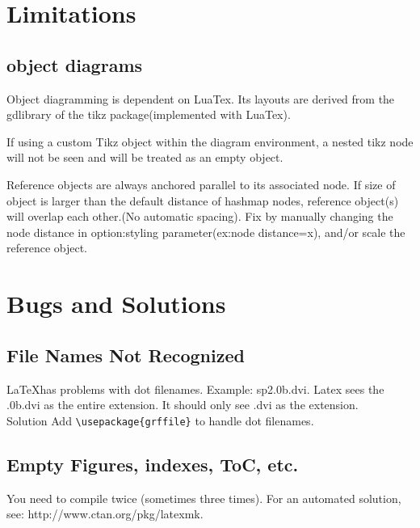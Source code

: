 \documentclass[a4paper]{article}
\begin{document}
\section{Limitations}
\subsection{object diagrams}

Object diagramming is dependent on LuaTex. Its layouts are derived from the gdlibrary of the tikz package(implemented with LuaTex).\\ \newline

If using a custom Tikz object within the diagram environment, a nested tikz node will not be seen and will be treated as an empty object.\\ \newline

Reference objects are always anchored parallel to its associated node. If size of object is larger than the default distance of hashmap nodes, reference object(s) will overlap each other.(No automatic spacing). Fix by manually changing the node distance in option:styling parameter(ex:node distance=x), and/or scale the reference object. \\ \newline

\vspace{3mm}

\section{Bugs and Solutions}
\subsection{File Names Not Recognized}
\LaTeX has problems with dot filenames.
Example:  sp2.0b.dvi. Latex sees the .0b.dvi as the entire extension. It should only see .dvi as the extension.\\
Solution
Add \verb!\usepackage{grffile}! to handle dot filenames.
\subsection{Empty Figures, indexes, ToC, etc.}
You need to compile twice (sometimes three times). For an automated solution, see:  http://www.ctan.org/pkg/latexmk.
\clearpage
\end{document}
